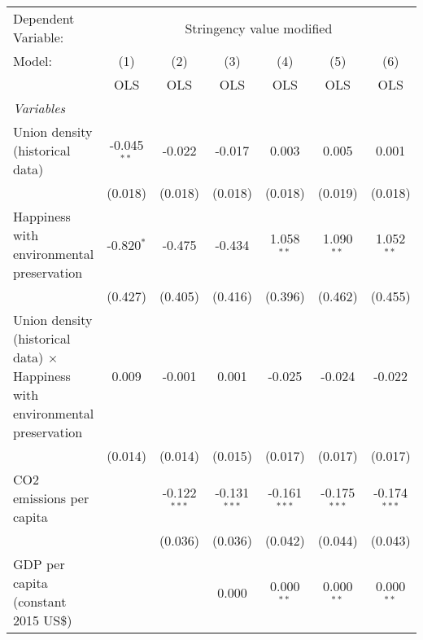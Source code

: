 
\begingroup
\centering
\begin{tabular}{lcccccc}
   \toprule
   Dependent Variable: & \multicolumn{6}{c}{Stringency value modified}\\
   Model:                                                                              & (1)           & (2)            & (3)            & (4)            & (5)            & (6)\\  
                                                                                       &  OLS          & OLS            & OLS            & OLS            & OLS            & OLS\\  
   \midrule
   \emph{Variables}\\
   Union density (historical data)                                                     & -0.045$^{**}$ & -0.022         & -0.017         & 0.003          & 0.005          & 0.001\\   
                                                                                       & (0.018)       & (0.018)        & (0.018)        & (0.018)        & (0.019)        & (0.018)\\   
   Happiness with environmental preservation                                           & -0.820$^{*}$  & -0.475         & -0.434         & 1.058$^{**}$   & 1.090$^{**}$   & 1.052$^{**}$\\   
                                                                                       & (0.427)       & (0.405)        & (0.416)        & (0.396)        & (0.462)        & (0.455)\\   
   Union density (historical data) $\times$ Happiness with environmental preservation  & 0.009         & -0.001         & 0.001          & -0.025         & -0.024         & -0.022\\   
                                                                                       & (0.014)       & (0.014)        & (0.015)        & (0.017)        & (0.017)        & (0.017)\\   
   CO2 emissions per capita                                                            &               & -0.122$^{***}$ & -0.131$^{***}$ & -0.161$^{***}$ & -0.175$^{***}$ & -0.174$^{***}$\\   
                                                                                       &               & (0.036)        & (0.036)        & (0.042)        & (0.044)        & (0.043)\\   
   GDP per capita (constant 2015 US\$)                                                 &               &                & 0.000          & 0.000$^{**}$   & 0.000$^{**}$   & 0.000$^{**}$\\   

\end{tabular}
